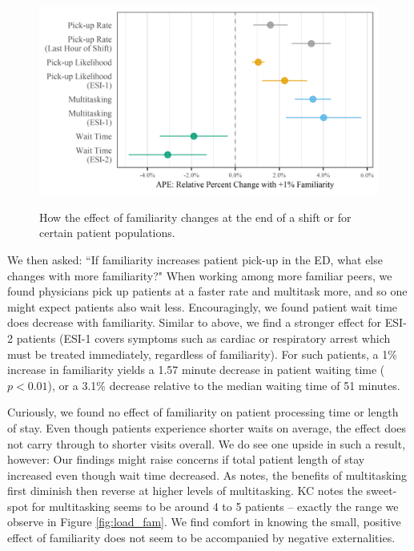  \begin{figure} %
     \centering
     \caption{How the effect of familiarity changes at the end of a shift or for certain patient populations.} \smallskip
     \includegraphics[scale=1]{Figures/PU/Post Hoc - Coef Plot.png}     
     \label{fig:coef_plot}
 \end{figure} 
 
 We then asked: “If familiarity increases patient pick-up in the ED, what else changes with more familiarity?" When working among more familiar peers, we found physicians pick up patients at a faster rate and multitask more, and so one might expect patients also wait less. Encouragingly, we found patient wait time does decrease with familiarity. Similar to above, we find a stronger effect for ESI-2 patients (ESI-1 covers symptoms such as cardiac or respiratory arrest which must be treated immediately, regardless of familiarity). For such patients, a 1\% increase in familiarity yields a 1.57 minute decrease in patient waiting time ($p < 0.01$), or a 3.1\% decrease relative to the median waiting time of 51 minutes.
 
 Curiously, we found no effect of familiarity on patient processing time or length of stay. Even though patients experience shorter waits on average, the effect does not carry through to shorter visits overall. We do see one upside in such a result, however: Our findings might raise concerns if total patient length of stay increased even though wait time decreased. As \cite{KC2014} notes, the benefits of multitasking first diminish then reverse at higher levels of multitasking. KC notes the sweet-spot for multitasking seems to be around 4 to 5 patients -- exactly the range we observe in Figure \ref{fig:load_fam}. We find comfort in knowing the small, positive effect of familiarity does not seem to be accompanied by negative externalities.
 
